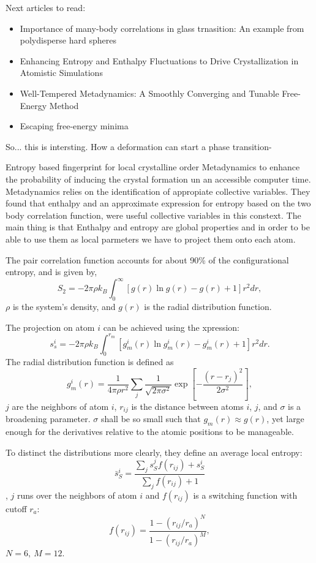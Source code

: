 \documentclass[a4paper, 11pt, oneside]{researchjournal} %
\begin{document}
Next articles to read:
\begin{itemize}
	\item Importance of many-body correlations in glass trnasition: An example from polydisperse hard spheres
	\item Enhancing Entropy and Enthalpy Fluctuations to Drive Crystallization in Atomistic Simulations
	\item Well-Tempered Metadynamics: A Smoothly Converging and Tunable Free-Energy Method
	\item Escaping free-energy minima
\end{itemize}


So... this is intersting. How a deformation can start a phase transition-


Entropy based fingerprint for local crystalline order 
Metadynamics to enhance the probability of inducing the crystal formation un an accessible computer time.
Metadynamics relies on the identification of appropiate collective variables.
They found that enthalpy and an approximate expression for entropy based on the two body correlation function, were useful collective variables in this constext.
The main thing is that Enthalpy and entropy are global properties and in order to be able to use them as local parmeters we have to project them onto each atom.

The pair correlation function accounts for about 90\% of the configurational entropy, and is given by,
$$S_2 = -2\pi\rho k_B\int_{0}^{\infty}\left[g(r)\ln g(r)-g(r)+1\right]r^2 dr,$$
$\rho$ is the system's density, and $g(r)$ is the radial distribution function.

The projection on atom $i$ can be achieved using the xpression:
$$s_s^i = -2\pi\rho k_B\int_{0}^{r_m}\left[g_m^i(r)\ln g_m^i(r)-g_m^i(r)+1\right]r^2 dr.$$
The radial distribution function is defined as 
$$ g_m^i(r) = \frac{1}{4\pi\rho r^2}\sum_{j}\frac{1}{\sqrt{2\pi\sigma^2}}\exp\left[-\frac{(r-r_j)^2}{2\sigma^2}\right],$$
$j$ are the neighbors of atom $i$,
$r_{ij}$ is the distance between atoms $i$, $j$, 
and $\sigma$ is a broadening parameter.
$\sigma$ shall be so small such that $g_m(r)\approx g(r)$, yet large enough for the derivatives relative to the atomic positions to be manageable.

To distinct the distributions more clearly, they define an average local entropy:
$$\bar{s}_S^i = \frac{\sum_j s_S^j f(r_{ij})+s_S^i}{\sum_j f(r_{ij}) +1}$$,
$j$ runs over the neighbors of atom $i$ and $f(r_{ij})$ is a switching function with cutoff $r_a$:
$$ f(r_{ij}) = \frac{1-(r_{ij}/r_a)^N}{1-(r_{ij}/r_a)^M}, $$
$N=6,~M = 12$.
\end{document}
